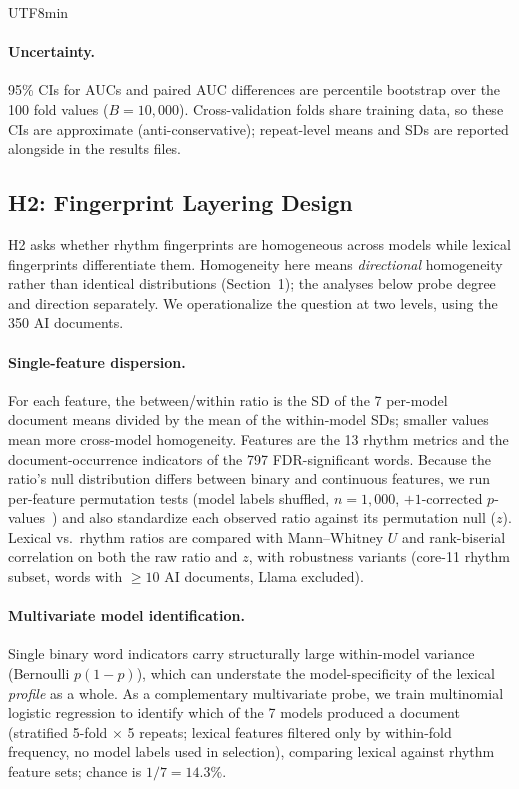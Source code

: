 \documentclass[11pt,a4paper]{article}
\begin{document}
\begin{CJK}{UTF8}{min}
\paragraph{Uncertainty.} 95\% CIs for AUCs and paired AUC differences are percentile bootstrap over the 100 fold values ($B=10{,}000$). Cross-validation folds share training data, so these CIs are approximate (anti-conservative); repeat-level means and SDs are reported alongside in the results files.

\subsection{H2: Fingerprint Layering Design}
\label{sec:h2method}

H2 asks whether rhythm fingerprints are homogeneous across models while lexical fingerprints differentiate them. Homogeneity here means \emph{directional} homogeneity rather than identical distributions (Section~1); the analyses below probe degree and direction separately. We operationalize the question at two levels, using the 350 AI documents.

\paragraph{Single-feature dispersion.} For each feature, the between/within ratio is the SD of the 7 per-model document means divided by the mean of the within-model SDs; smaller values mean more cross-model homogeneity. Features are the 13 rhythm metrics and the document-occurrence indicators of the 797 FDR-significant words. Because the ratio's null distribution differs between binary and continuous features, we run per-feature permutation tests (model labels shuffled, $n=1{,}000$, $+1$-corrected $p$-values~\citep{phipson2010permutation}) and also standardize each observed ratio against its permutation null ($z$). Lexical vs.\ rhythm ratios are compared with Mann--Whitney $U$ and rank-biserial correlation on both the raw ratio and $z$, with robustness variants (core-11 rhythm subset, words with $\geq 10$ AI documents, Llama excluded).

\paragraph{Multivariate model identification.} Single binary word indicators carry structurally large within-model variance (Bernoulli $p(1-p)$), which can understate the model-specificity of the lexical \emph{profile} as a whole. As a complementary multivariate probe, we train multinomial logistic regression to identify which of the 7 models produced a document (stratified 5-fold $\times$ 5 repeats; lexical features filtered only by within-fold frequency, no model labels used in selection), comparing lexical against rhythm feature sets; chance is $1/7 = 14.3\%$.


\end{CJK}
\end{document}

